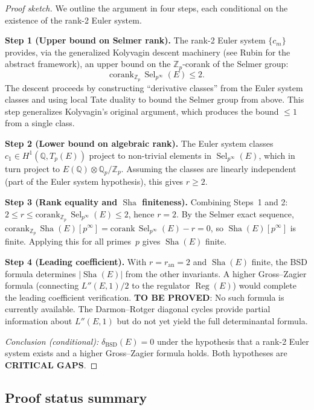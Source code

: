 \documentclass[11pt]{article}
\DeclareMathOperator{\Reg}{Reg}
\DeclareMathOperator{\Sha}{Sha}
\DeclareMathOperator{\Sel}{Sel}
\begin{document}
\begin{proof}[Proof sketch]
We outline the argument in four steps, each conditional on the existence of
the rank-2 Euler system.

\textbf{Step 1 (Upper bound on Selmer rank).}
The rank-2 Euler system $\{c_m\}$ provides, via the generalized Kolyvagin
descent machinery (see Rubin \cite{Rubin} for the abstract framework), an
upper bound on the $\mathbb{Z}_p$-corank of the Selmer group:
\[
  \mathrm{corank}_{\mathbb{Z}_p}\, \Sel_{p^\infty}(E) \leq 2.
\]
The descent proceeds by constructing ``derivative classes'' from the Euler
system classes and using local Tate duality to bound the Selmer group from
above.  This step generalizes Kolyvagin's original argument, which produces
the bound $\leq 1$ from a single class.

\textbf{Step 2 (Lower bound on algebraic rank).}
The Euler system classes $c_1 \in H^1(\mathbb{Q}, T_p(E))$ project to
non-trivial elements in $\Sel_{p^\infty}(E)$, which in turn project to
$E(\mathbb{Q}) \otimes \mathbb{Q}_p/\mathbb{Z}_p$.  Assuming the classes
are linearly independent (part of the Euler system hypothesis), this gives
$r \geq 2$.

\textbf{Step 3 (Rank equality and $\Sha$ finiteness).}
Combining Steps~1 and 2: $2 \leq r \leq
\mathrm{corank}_{\mathbb{Z}_p}\, \Sel_{p^\infty}(E) \leq 2$, hence $r = 2$.
By the Selmer exact sequence, $\mathrm{corank}_{\mathbb{Z}_p}\,
\Sha(E)[p^\infty] = \mathrm{corank}\, \Sel_{p^\infty}(E) - r = 0$, so
$\Sha(E)[p^\infty]$ is finite.  Applying this for all primes~$p$ gives
$\Sha(E)$ finite.

\textbf{Step 4 (Leading coefficient).}
With $r = r_{\mathrm{an}} = 2$ and $\Sha(E)$ finite, the BSD formula
determines $|\Sha(E)|$ from the other invariants.  A higher Gross--Zagier
formula (connecting $L''(E,1)/2$ to the regulator $\Reg(E)$) would complete
the leading coefficient verification.  \textbf{TO BE PROVED}: No such
formula is currently available.  The Darmon--Rotger diagonal cycles \cite{DR}
provide partial information about $L''(E,1)$ but do not yet yield the full
determinantal formula.

\emph{Conclusion (conditional):}
$\delta_{\mathrm{BSD}}(E) = 0$ under the hypothesis that a rank-2 Euler
system exists and a higher Gross--Zagier formula holds.  Both hypotheses
are \textbf{CRITICAL GAPS}.
\end{proof}

\subsection{Proof status summary}
\end{document}
